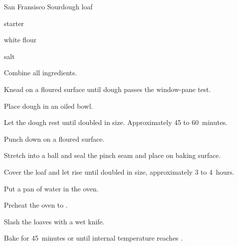 \begin{recipe}{San Fransisco Sourdough}{}{\kgr{\half} loaf}

\begin{ingredients}
\item \C{1\threequarter} starter
\item {} white flour
\item {} salt
\end{ingredients}

\begin{directions}
\item Combine all ingredients.
\item Knead on a floured surface until dough passes the window-pane test.
\item Place dough in an oiled bowl.
\item Let the dough rest until doubled in size. Approximately 45 to 60~minutes.
\item Punch down on a floured surface.
\item Stretch into a ball and seal the pinch seam and place on baking surface.
\item Cover the loaf and let rise until doubled in size, approximately 3 to 4~hours.
\item Put a pan of water in the oven.
\item Preheat the oven to .
\item Slash the loaves with a wet knife.
\item Bake for 45~minutes or until internal temperature reaches .
\end{directions}
\end{recipe}
